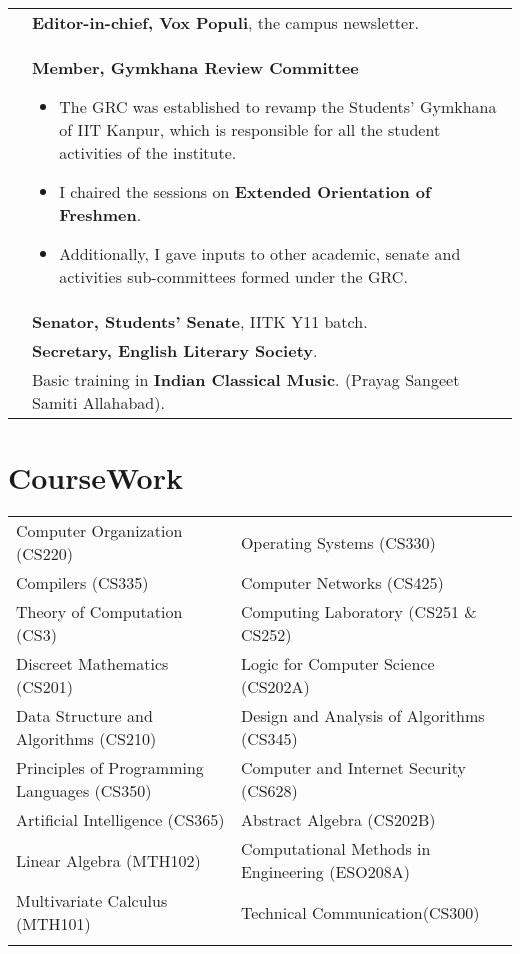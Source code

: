 \documentclass[a4paper,10pt]{article} %
\begin{document}
\begin{tabular}{>{\raggedleft}p{2.2cm}p{14cm}}
    2013 & \textbf{Editor-in-chief, Vox Populi}, the campus newsletter. \\

    2012 & \textbf{Member, Gymkhana Review Committee}
           \footnotesize{
               \begin{itemize}[leftmargin=*]
                   \item The GRC was established to revamp the Students' Gymkhana of IIT Kanpur,
                       which is responsible for all the student activities of the institute.
                   \item I chaired the sessions on \textbf{Extended Orientation of Freshmen}.
                   \item Additionally, I gave inputs to other academic, senate and activities sub-committees formed
                       under the GRC.
               \end{itemize}
           }\\

    2012 & \textbf{Senator, Students' Senate}, IITK Y11 batch. \\

    2012 & \textbf{Secretary, English Literary Society}. \\

    2010 & Basic training in \textbf{Indian Classical Music}. (Prayag Sangeet Samiti Allahabad). \\

\end{tabular}

\section{CourseWork}

\begin{tabular}{>{\raggedleft}p{8cm}|p{8cm}}

    Computer Organization (CS220) & Operating Systems (CS330) \\
    Compilers (CS335) & Computer Networks (CS425) \\
    Theory of Computation (CS3) & Computing Laboratory (CS251 \& CS252)\\
    Discreet Mathematics (CS201) & Logic for Computer Science (CS202A)\\
    Data Structure and Algorithms (CS210) & Design and Analysis of Algorithms (CS345)\\
    Principles of Programming Languages (CS350) & Computer and Internet Security (CS628)\\
    Artificial Intelligence (CS365) & Abstract Algebra (CS202B)\\
    Linear Algebra (MTH102) & Computational Methods in Engineering (ESO208A)\\
    Multivariate Calculus (MTH101) & Technical Communication(CS300)\\
                     \\
\end{tabular}
\end{document}

